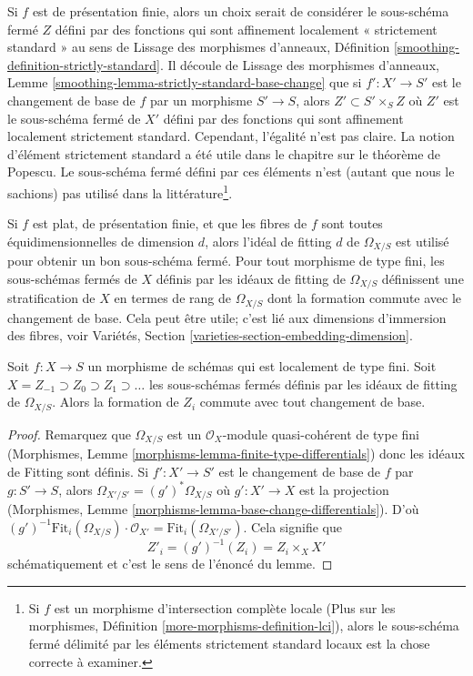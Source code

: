 \medskip\noindent
Si  $f$  est de présentation finie, alors un choix serait de considérer le
sous-schéma fermé  $Z$  défini par des fonctions qui sont affinement
localement « strictement standard » au sens de Lissage des morphismes d'anneaux, Définition
 \ref{smoothing-definition-strictly-standard}. Il découle de Lissage des morphismes d'anneaux, Lemme  \ref{smoothing-lemma-strictly-standard-base-change}  que si
 $f' : X' \to S'$  est le changement de base de  $f$  par un morphisme
 $S' \to S$, alors  $Z' \subset S' \times_S Z$  où  $Z'$  est le sous-schéma fermé de
 $X'$  défini par des fonctions qui sont affinement localement strictement
standard. Cependant, l'égalité n'est pas claire. La notion d'élément strictement
standard a été utile dans le chapitre sur le théorème de Popescu. Le sous-schéma
fermé défini par ces éléments n'est (autant que nous le sachions) pas utilisé dans
la littérature\footnote{Si  $f$  est un morphisme
d'intersection complète locale (Plus sur les morphismes, Définition  \ref{more-morphisms-definition-lci}),
alors le sous-schéma fermé délimité par les éléments strictement standard locaux
est la chose correcte à examiner.}.

\medskip\noindent
Si  $f$  est plat, de présentation finie, et que les fibres de  $f$ 
sont toutes équidimensionnelles de dimension  $d$, alors l'idéal de
fitting  $d$ de  $\Omega_{X/S}$  est utilisé pour obtenir un bon sous-schéma
fermé. Pour tout morphisme de type fini, les sous-schémas fermés de  $X$ 
définis par les idéaux de fitting de  $\Omega_{X/S}$  définissent une stratification
de  $X$  en termes de rang de  $\Omega_{X/S}$  dont la formation commute avec
le changement de base. Cela peut être utile; c'est lié aux dimensions d'immersion
des fibres, voir Variétés, Section  \ref{varieties-section-embedding-dimension}.

\begin{lemma}
\label{lemma-base-change-and-fitting-ideal-omega}
Soit  $f : X \to S$  un morphisme de schémas qui est localement de type fini. Soit
 $X = Z_{-1} \supset Z_0 \supset Z_1 \supset \ldots$  les sous-schémas fermés définis par les idéaux de fitting de
 $\Omega_{X/S}$. Alors la formation de  $Z_i$  commute avec tout changement de
base.
\end{lemma}

\begin{proof}
Remarquez que  $\Omega_{X/S}$  est un  $\mathcal{O}_X$-module quasi-cohérent de type fini
(Morphismes, Lemme  \ref{morphisms-lemma-finite-type-differentials}) donc les idéaux de Fitting sont définis. Si
 $f' : X' \to S'$  est le changement de base de  $f$  par  $g : S' \to S$, alors
 $\Omega_{X'/S'} = (g')^*\Omega_{X/S}$  où  $g' : X' \to X$  est la projection (Morphismes, Lemme  \ref{morphisms-lemma-base-change-differentials}).
D'où  $(g')^{-1}\text{Fit}_i(\Omega_{X/S}) \cdot \mathcal{O}_{X'} =
\text{Fit}_i(\Omega_{X'/S'})$. Cela signifie que
$$
Z'_i = (g')^{-1}(Z_i) = Z_i \times_X X'
$$
schématiquement et c'est le sens de l'énoncé du lemme.
\end{proof}

